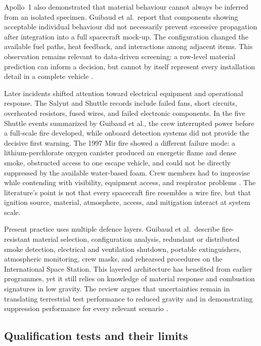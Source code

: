 Apollo~1 also demonstrated that material behaviour cannot always be inferred from an isolated specimen. Guibaud et al.\ report that components showing acceptable individual behaviour did not necessarily prevent excessive propagation after integration into a full spacecraft mock-up. The configuration changed the available fuel paths, heat feedback, and interactions among adjacent items. This observation remains relevant to data-driven screening: a row-level material prediction can inform a decision, but cannot by itself represent every installation detail in a complete vehicle \cite{guibaud2022spacecraft}.

Later incidents shifted attention toward electrical equipment and operational response. The Salyut and Shuttle records include failed fans, short circuits, overheated resistors, fused wires, and failed electronic components. In the five Shuttle events summarized by Guibaud et al., the crew interrupted power before a full-scale fire developed, while onboard detection systems did not provide the decisive first warning. The 1997 Mir fire showed a different failure mode: a lithium-perchlorate oxygen canister produced an energetic flame and dense smoke, obstructed access to one escape vehicle, and could not be directly suppressed by the available water-based foam. Crew members had to improvise while contending with visibility, equipment access, and respirator problems \cite{guibaud2022spacecraft}. The literature's point is not that every spacecraft fire resembles a wire fire, but that ignition source, material, atmosphere, access, and mitigation interact at system scale.

Present practice uses multiple defence layers. Guibaud et al.\ describe fire-resistant material selection, configuration analysis, redundant or distributed smoke detection, electrical and ventilation shutdown, portable extinguishers, atmospheric monitoring, crew masks, and rehearsed procedures on the International Space Station. This layered architecture has benefited from earlier programmes, yet it still relies on knowledge of material response and combustion signatures in low gravity. The review argues that uncertainties remain in translating terrestrial test performance to reduced gravity and in demonstrating suppression performance for every relevant scenario \cite{guibaud2022spacecraft}.

\subsection{Qualification tests and their limits}

